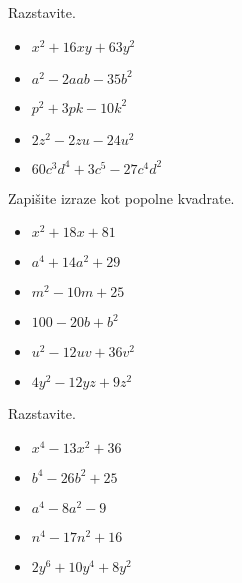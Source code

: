     
        
            \begin{naloga}
                Razstavite.
                \begin{itemize}
                    \item $x^2+16xy+63y^2$ 
                    \item $a^2-2aab-35b^2$ 
                    \item $p^2+3pk-10k^2$ 
                    \item $2z^2-2zu-24u^2$ 
                    \item $60c^3d^4+3c^5-27c^4d^2$ 
                \end{itemize}
            \end{naloga}
        
    
        
            \begin{naloga}
                Zapišite izraze kot popolne kvadrate.
                \begin{itemize}
                    \item $x^2+18x+81$ 
                    \item $a^4+14a^2+29$ 
                    \item $m^2-10m+25$ 
                    \item $100-20b+b^2$ 
                    \item $u^2-12uv+36v^2$ 
                    \item $4y^2-12yz+9z^2$ 
                \end{itemize}
            \end{naloga}
        
    
        
            \begin{naloga}
                Razstavite.
                \begin{itemize}
                    \item $x^4-13x^2+36$ 
                    \item $b^4-26b^2+25$ 
                    \item $a^4-8a^2-9$ 
                    \item $n^4-17n^2+16$ 
                    \item $2y^6+10y^4+8y^2$ 
                \end{itemize}
            \end{naloga}
    
    
        
